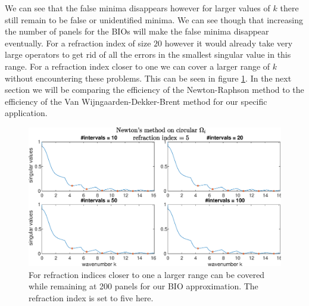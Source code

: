 \documentclass[a4paper, oneside]{discothesis}
\begin{document}
We can see that the false minima disappears however for larger values of $k$ there still remain to be false or unidentified minima.
We can see though that increasing the number of panels for the BIOs will make the false minima disappear eventually.
For a refraction index of size $20$ however it would already take very large operators to get rid of all the errors in the smallest singular value in this range.
For a refraction index closer to one we can cover a larger range of $k$ without encountering these problems.
This can be seen in figure \ref{fig:roots_newton_circle_200_5}.
In the next section we will be comparing the efficiency of the Newton-Raphson method to the efficiency of the Van Wijngaarden-Dekker-Brent method for our specific application.

\begin{figure} [H]
	\centering
	\includegraphics[width=\columnwidth]{figures/roots_newton_circle_200_5.eps}
	\caption{
		For refraction indices closer to one a larger range can be covered while remaining at 200 panels for our BIO approximation.
		The refraction index is set to five here.
	}
	\label{fig:roots_newton_circle_200_5}
\end{figure}
\end{document}
